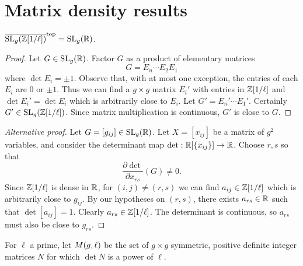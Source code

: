 \documentclass{amsart}
\begin{document}
\section{Matrix density results}
\label{sec:matr-dens-results}

\begin{lemma}\label{lemma:sl-z-1overl-dense-sl-r}
  $\overline{\operatorname{SL}_g(\mathbb{Z}[1/\ell])}^\mathrm{top} = \operatorname{SL}_g(\mathbb{R})$.
\end{lemma}

\begin{proof}
  Let $G \in \operatorname{SL}_g(\mathbb{R})$. Factor $G$ as a product of elementary matrices
  \[
    G = E_n \cdots E_2 E_1
  \]
  where $\det E_i = \pm 1$. Observe that, with at most one exception, the entries of each $E_i$ are $0$ or $\pm 1$. Thus we can find a $g \times g$ matrix $E_i'$ with entries in $\mathbb{Z}[1/\ell]$ and $\det E_i' = \det E_i$ which is arbitrarily close to $E_i$. Let $G' = E_n' \cdots E_1'$. Certainly $G' \in \operatorname{SL}_g(\mathbb{Z}[1/\ell])$. Since matrix multiplication is continuous, $G'$ is close to $G$.
\end{proof}

\begin{proof}[Alternative proof]
  Let $G = [g_{ij}] \in \operatorname{SL}_g(\mathbb{R})$. Let $X = [x_{ij}]$ be a matrix of $g^2$ variables, and consider the determinant map $\det: \mathbb{R}[\{x_{ij}\}] \to \mathbb{R}$. Choose $r,s$ so that
  \[
    \frac{\partial \det}{\partial x_{rs}}(G) \neq 0.
  \]
  Since $\mathbb{Z}[1/\ell]$ is dense in $\mathbb{R}$, for $(i,j) \neq (r,s)$ we can find $a_{ij} \in \mathbb{Z}[1/\ell]$ which is arbitrarily close to $g_{ij}$. By our hypotheses on $(r,s)$, there exists $a_{rs} \in \mathbb{R}$ such that $\det [a_{ij}] = 1$. Clearly $a_{rs} \in \mathbb{Z}[1/\ell]$. The determinant is continuous, so $a_{rs}$ must also be close to $g_{rs}$.
\end{proof}



\begin{definition}
  For $\ell$ a prime, let $M(g,\ell)$ be the set of $g \times g$ symmetric, positive definite integer matrices $N$ for which $\det N$ is a power of $\ell$.
\end{definition}
\end{document}

